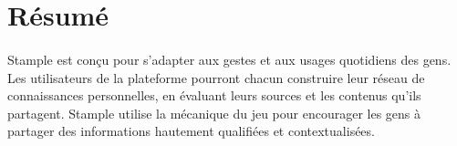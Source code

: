\section{Résumé}

\paragraph{}
Stample est conçu pour s'adapter aux gestes et aux usages quotidiens des gens. Les utilisateurs de la plateforme pourront chacun construire leur réseau de connaissances personnelles, en évaluant leurs sources et les contenus qu'ils partagent.
Stample utilise la mécanique du jeu pour encourager les gens à partager des informations hautement qualifiées et contextualisées.
